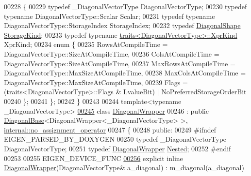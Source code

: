 \begin{DoxyCode}
00228 \{
00229   \textcolor{keyword}{typedef} \_DiagonalVectorType DiagonalVectorType;
00230   \textcolor{keyword}{typedef} \textcolor{keyword}{typename} DiagonalVectorType::Scalar Scalar;
00231   \textcolor{keyword}{typedef} \textcolor{keyword}{typename} DiagonalVectorType::StorageIndex StorageIndex;
00232   \textcolor{keyword}{typedef} \hyperlink{struct_eigen_1_1_diagonal_shape}{DiagonalShape} \hyperlink{struct_eigen_1_1_diagonal_shape}{StorageKind};
00233   \textcolor{keyword}{typedef} \textcolor{keyword}{typename} \hyperlink{struct_eigen_1_1internal_1_1traits}{traits<DiagonalVectorType>::XprKind} XprKind;
00234   \textcolor{keyword}{enum} \{
00235     RowsAtCompileTime = DiagonalVectorType::SizeAtCompileTime,
00236     ColsAtCompileTime = DiagonalVectorType::SizeAtCompileTime,
00237     MaxRowsAtCompileTime = DiagonalVectorType::MaxSizeAtCompileTime,
00238     MaxColsAtCompileTime = DiagonalVectorType::MaxSizeAtCompileTime,
00239     Flags =  (\hyperlink{struct_eigen_1_1internal_1_1traits}{traits<DiagonalVectorType>::Flags} & 
      \hyperlink{group__flags_gae2c323957f20dfdc6cb8f44428eaec1a}{LvalueBit}) | \hyperlink{group__flags_ga3c186ad80ddcf5e2ed3d7ee31cca1860}{NoPreferredStorageOrderBit}
00240   \};
00241 \};
00242 \}
00243 
00244 \textcolor{keyword}{template}<\textcolor{keyword}{typename} \_DiagonalVectorType>
\hyperlink{group___core___module}{00245} \textcolor{keyword}{class }\hyperlink{group___core___module_class_eigen_1_1_diagonal_wrapper}{DiagonalWrapper}
00246   : \textcolor{keyword}{public} \hyperlink{class_eigen_1_1_diagonal_base}{DiagonalBase}<DiagonalWrapper<\_DiagonalVectorType> >, 
      \hyperlink{class_eigen_1_1internal_1_1no__assignment__operator}{internal::no\_assignment\_operator}
00247 \{
00248   \textcolor{keyword}{public}:
00249 \textcolor{preprocessor}{    #ifndef EIGEN\_PARSED\_BY\_DOXYGEN}
00250     \textcolor{keyword}{typedef} \_DiagonalVectorType DiagonalVectorType;
00251     \textcolor{keyword}{typedef} \hyperlink{group___core___module_class_eigen_1_1_diagonal_wrapper}{DiagonalWrapper} \hyperlink{group___core___module_class_eigen_1_1_diagonal_wrapper}{Nested};
00252 \textcolor{preprocessor}{    #endif}
00253 
00255     EIGEN\_DEVICE\_FUNC
\hyperlink{group___core___module_a81574f47272fd5e519a19135a306529d}{00256}     \textcolor{keyword}{explicit} \textcolor{keyword}{inline} \hyperlink{group___core___module_a81574f47272fd5e519a19135a306529d}{DiagonalWrapper}(DiagonalVectorType& a\_diagonal) : m\_diagonal(a\_diagonal)

\end{DoxyCode}
